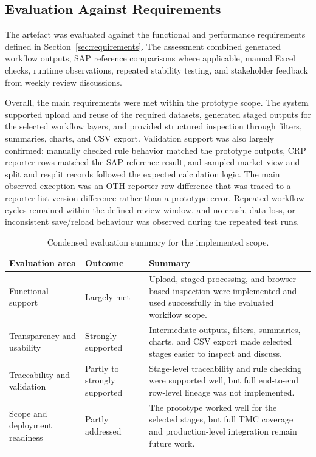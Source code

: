 



\subsection{Evaluation Against Requirements}

The artefact was evaluated against the functional and performance requirements defined in Section~\ref{sec:requirements}. The assessment combined generated workflow outputs, SAP reference comparisons where applicable, manual Excel checks, runtime observations, repeated stability testing, and stakeholder feedback from weekly review discussions.

Overall, the main requirements were met within the prototype scope. The system supported upload and reuse of the required datasets, generated staged outputs for the selected workflow layers, and provided structured inspection through filters, summaries, charts, and CSV export. Validation support was also largely confirmed: manually checked rule behavior matched the prototype outputs, CRP reporter rows matched the SAP reference result, and sampled market view and split and resplit records followed the expected calculation logic. The main observed exception was an OTH reporter-row difference that was traced to a reporter-list version difference rather than a prototype error. Repeated workflow cycles remained within the defined review window, and no crash, data loss, or inconsistent save/reload behaviour was observed during the repeated test runs.

\begin{table}[htbp]
    \centering
    \caption{Condensed evaluation summary for the implemented scope.}
    \label{tab:condensed_evaluation_summary}
    \setlength{\tabcolsep}{4pt}
    \small
    \begin{tabularx}{\textwidth}{|>{\raggedright\arraybackslash}p{3.4cm}|>{\raggedright\arraybackslash}p{2.3cm}|X|}
        \hline
        \textbf{Evaluation area} & \textbf{Outcome} & \textbf{Summary} \\
        \hline
        Functional support & Largely met & Upload, staged processing, and browser-based inspection were implemented and used successfully in the evaluated workflow scope. \\
        \hline
        Transparency and usability & Strongly supported & Intermediate outputs, filters, summaries, charts, and CSV export made selected stages easier to inspect and discuss. \\
        \hline
        Traceability and validation & Partly to strongly supported & Stage-level traceability and rule checking were supported well, but full end-to-end row-level lineage was not implemented. \\
        \hline
        Scope and deployment readiness & Partly addressed & The prototype worked well for the selected stages, but full TMC coverage and production-level integration remain future work. \\
        \hline
    \end{tabularx}
\end{table}


